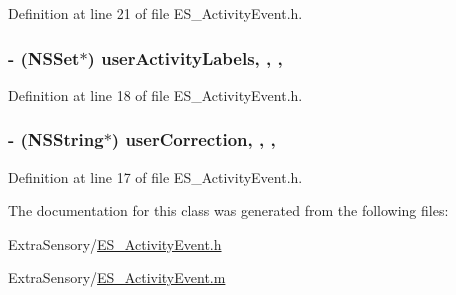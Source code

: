 Definition at line 21 of file E\+S\+\_\+\+Activity\+Event.\+h.

\hypertarget{interface_e_s___activity_event_a35041c5e0ff9f74fc2bcf29e0cc4e548}{
\subsubsection[{user\+Activity\+Labels}]{\setlength{\rightskip}{0pt plus 5cm}-\/ (N\+S\+Set$\ast$) user\+Activity\+Labels\hspace{0.3cm}{\ttfamily [read]}, {\ttfamily [write]}, {\ttfamily [nonatomic]}, {\ttfamily [retain]}}}\label{interface_e_s___activity_event_a35041c5e0ff9f74fc2bcf29e0cc4e548}


Definition at line 18 of file E\+S\+\_\+\+Activity\+Event.\+h.

\hypertarget{interface_e_s___activity_event_a24bd94d18e8d80df31ca1e876de3b468}{
\subsubsection[{user\+Correction}]{\setlength{\rightskip}{0pt plus 5cm}-\/ (N\+S\+String$\ast$) user\+Correction\hspace{0.3cm}{\ttfamily [read]}, {\ttfamily [write]}, {\ttfamily [nonatomic]}, {\ttfamily [retain]}}}\label{interface_e_s___activity_event_a24bd94d18e8d80df31ca1e876de3b468}


Definition at line 17 of file E\+S\+\_\+\+Activity\+Event.\+h.



The documentation for this class was generated from the following files\+:\begin{DoxyCompactItemize}
\item 
Extra\+Sensory/\hyperlink{_e_s___activity_event_8h}{E\+S\+\_\+\+Activity\+Event.\+h}\item 
Extra\+Sensory/\hyperlink{_e_s___activity_event_8m}{E\+S\+\_\+\+Activity\+Event.\+m}\end{DoxyCompactItemize}
